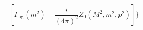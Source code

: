 \begin{equation}
-[I_{\log }(m^{2})-\frac{i}{(4\pi )^{2}}Z_{0}(M^{2},m^{2},p^{2})]\}
\end{equation}

